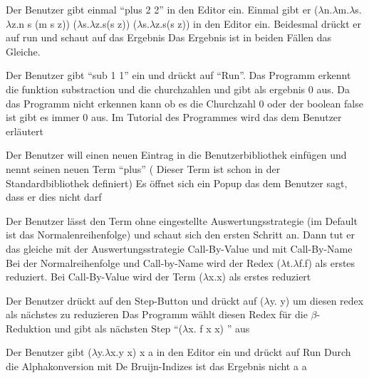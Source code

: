 \documentclass[parskip=full,11pt,twoside]{scrartcl}
\begin{document}
{Der Benutzer gibt einmal \enquote{plus 2 2} in den Editor ein. Einmal gibt er ($\lambda$n.$\lambda$m.$\lambda$s.$\lambda$z.n s (m s z)) ($\lambda$s.$\lambda$z.s(s z)) ($\lambda$s.$\lambda$z.s(s z)) in den Editor ein. Beidesmal drückt er auf run und schaut auf das Ergebnis}
{Das Ergebnis ist in beiden Fällen das Gleiche. }

{Der Benutzer gibt \enquote{sub 1 1} ein und drückt auf \enquote{Run}.}
{Das Programm erkennt die funktion substraction und die churchzahlen und gibt als ergebnis 0 aus. Da das Programm nicht erkennen kann ob es die Churchzahl 0 oder der boolean false ist gibt es immer 0 aus. Im Tutorial des Programmes wird das dem Benutzer erläutert }

{Der Benutzer will einen neuen Eintrag in die Benutzerbibliothek einfügen und nennt seinen neuen Term \enquote{plus} ( Dieser Term ist schon in der Standardbibliothek definiert) }
{Es öffnet sich ein Popup das dem Benutzer sagt, dass er dies nicht darf}



{Der Benutzer lässt den Term ohne eingestellte Auswertungsstrategie (im Default ist das Normalenreihenfolge) und schaut sich den ersten Schritt an. Dann tut er das gleiche mit der Auswertungsstrategie Call-By-Value und  mit Call-By-Name}
{ Bei der Normalreihenfolge und Call-by-Name wird der Redex ($\lambda$t.$\lambda$f.f) als erstes reduziert. Bei Call-By-Value wird der Term ($\lambda$x.x) als erstes reduziert }

{Der Benutzer drückt auf den Step-Button und drückt auf ($\lambda$y. y) um diesen redex als nächstes zu reduzieren}
{Das Programm wählt diesen Redex für die $\beta$-Reduktion und gibt als nächsten Step \enquote{($\lambda$x. f x x) } aus  }


{ Der Benutzer gibt ($\lambda$y.$\lambda$x.y x) x a in den Editor ein und drückt auf Run}
{ Durch die Alphakonversion mit De Bruijn-Indizes ist das Ergebnis nicht a  a  }
\end{document}

